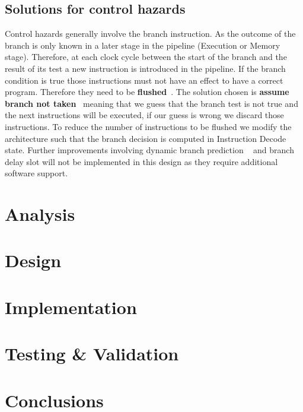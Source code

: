 \documentclass[a4paper,12pt]{report}
\begin{document}
\section{Solutions for control hazards}
Control hazards generally involve the branch instruction. As the outcome of the branch is only known in a later stage in the pipeline (Execution or Memory stage). Therefore, at each clock cycle between the start of the branch and the result of its test a new instruction is introduced in the pipeline. If the branch condition is true those instructions must not have an effect to have a correct program. Therefore they need to be \textbf{flushed}~\cite{patterson2014computer}. The solution chosen is \textbf{assume branch not taken}~\cite{patterson2014computer} meaning that we guess that the branch test is not true and the next instructions will be executed, if our guess is wrong we discard those instructions. To reduce the number of instructions to be flushed we modify the architecture such that the branch decision is computed in Instruction Decode state. Further improvements involving dynamic branch prediction ~\cite{articleBP} and branch delay slot will not be implemented in this design as they require additional software support.



\chapter{Analysis}

\chapter{Design}

\chapter{Implementation}

\chapter{Testing \& Validation}

\chapter{Conclusions}



\end{document}
